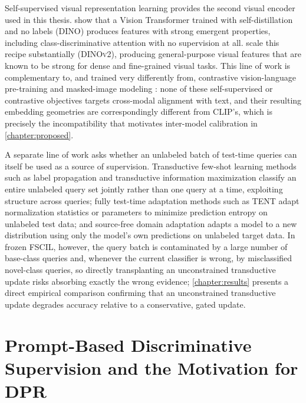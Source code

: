 \documentclass{iutbscthesis}
\begin{document}
Self-supervised visual representation learning provides the second visual encoder used in this thesis. \textcite{caron2021emerging} show that a Vision Transformer \autocite{dosovitskiy2021image} trained with self-distillation and no labels (\textsc{DINO}) produces features with strong emergent properties, including class-discriminative attention with no supervision at all. \textcite{oquab2023dinov2} scale this recipe substantially (\textsc{DINOv2}), producing general-purpose visual features that are known to be strong for dense and fine-grained visual tasks. This line of work is complementary to, and trained very differently from, contrastive vision-language pre-training \autocite{chen2020simple, radford2021learning} and masked-image modeling \autocite{he2022masked}: none of these self-supervised or contrastive objectives targets cross-modal alignment with text, and their resulting embedding geometries are correspondingly different from CLIP's, which is precisely the incompatibility that motivates inter-model calibration in \autoref{chapter:proposed}.

A separate line of work asks whether an unlabeled batch of test-time queries can itself be used as a source of supervision. Transductive few-shot learning methods such as label propagation \autocite{liu2019transductive} and transductive information maximization \autocite{boudiaf2020transductive} classify an entire unlabeled query set jointly rather than one query at a time, exploiting structure across queries; fully test-time adaptation methods such as \textsc{TENT} \autocite{wang2021tent} adapt normalization statistics or parameters to minimize prediction entropy on unlabeled test data; and source-free domain adaptation \autocite{liang2020source} adapts a model to a new distribution using only the model's own predictions on unlabeled target data. In frozen FSCIL, however, the query batch is contaminated by a large number of base-class queries and, whenever the current classifier is wrong, by misclassified novel-class queries, so directly transplanting an unconstrained transductive update risks absorbing exactly the wrong evidence; \autoref{chapter:results} presents a direct empirical comparison confirming that an unconstrained transductive update degrades accuracy relative to a conservative, gated update.

\section{Prompt-Based Discriminative Supervision and the Motivation for DPR}
\end{document}
